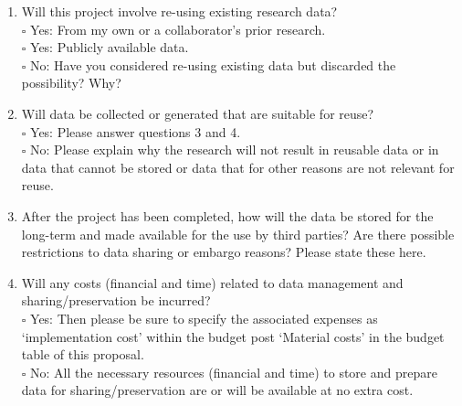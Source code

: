 \documentclass[a4paper,10pt,fleqn]{application}
\begin{document}
\begin{enumerate}[align=left,labelindent=0pt,labelsep=!,itemindent=0pt,labelwidth=1em]
\item Will this project involve re-using existing research data?\\ %
$\square$ Yes: From my own or a collaborator's prior research.\\ %
$\square$ Yes: Publicly available data.\\ %
$\square$ No: Have you considered re-using existing data but discarded the possibility? Why? %

\item Will data be collected or generated that are suitable for reuse? \\ %
$\square$ Yes: Please answer questions 3 and 4.\\ %
$\square$ No: Please explain why the research will not result in reusable data or in data that cannot be stored or data that for other reasons are not relevant for reuse. 

\item After the project has been completed, how will the data be stored for the long-term and made available for the use by third parties? Are there possible restrictions to data sharing or embargo reasons? Please state these here.


\item Will any costs (financial and time) related to data management and sharing/preservation be incurred?\\ %
$\square$ Yes: Then please be sure to specify the associated expenses as ‘implementation cost’ within the budget post ‘Material costs’ in the budget table of this proposal.\\ %
$\square$ No: All the necessary resources (financial and time) to store and prepare data for sharing/preservation are or will be available at no extra cost. %

\end{enumerate}





\end{document}
